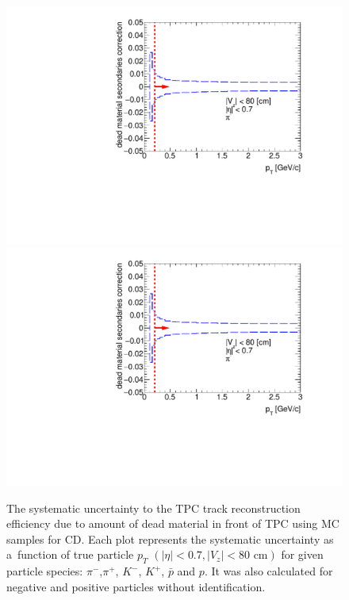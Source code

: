 \begin{figure}[hb]
\caption[The systematic uncertainty to the TPC track reconstruction efficiency due to  amount of dead material in front of TPC using MC samples for CD]{The systematic uncertainty to the TPC track reconstruction efficiency due to  amount of dead material in front of TPC using MC samples for CD. Each plot represents the systematic uncertainty as a~function of true particle $p_T$ $\left(|\eta|<0.7, |V_{z}|<80 \text{ cm}\right)$ for given particle species: $\pi^-$,$\pi^+$, $K^-$, $K^+$, $\bar{p}$ and $p$. It was also calculated for negative and positive particles without identification. }\label{fig:dead_materialCD1D}
\centering
\parbox{0.495\textwidth}{
  \centering
  \includegraphics[width=\linewidth,page=1]{graphics/systematicsEfficiency/deadMaterial/secondaries_Unbinned_CD_1D.pdf}\\
  \includegraphics[width=\linewidth,page=2]{graphics/systematicsEfficiency/deadMaterial/secondaries_Unbinned_CD_1D.pdf}\\
}
\end{figure}
